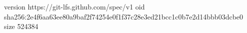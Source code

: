 version https://git-lfs.github.com/spec/v1
oid sha256:2e4f6aa63ee80a9baf2f74254e0f1f37c28e3ed21bcc1c0b7e2d14bbb03dcbe0
size 524384
